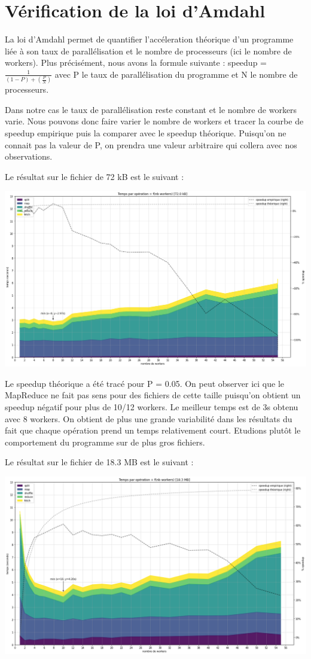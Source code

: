 \documentclass[11pt,a4paper]{article}
\begin{document}
\section{Vérification de la loi d'Amdahl}
La loi d'Amdahl permet de quantifier l'accéleration théorique d'un programme liée à son taux de parallélisation et le nombre de processeurs (ici le nombre de workers). Plus précisément, nous avons la formule suivante : speedup = $\frac{1}{(1-P)+(\frac{P}{N})}$ avec P le taux de parallélisation du programme et N le nombre de processeurs.

Dans notre cas le taux de parallélisation reste constant et le nombre de workers varie. Nous pouvons donc faire varier le nombre de workers et tracer la courbe de speedup empirique puis la comparer avec le speedup théorique. Puisqu'on ne connait pas la valeur de P, on prendra une valeur arbitraire qui collera avec nos observations.

Le résultat sur le fichier de 72 kB est le suivant :

\includegraphics[width=\columnwidth]{graph0.png}

Le speedup théorique a été tracé pour P = 0.05. On peut observer ici que le MapReduce ne fait pas sens pour des fichiers de cette taille puisqu'on obtient un speedup négatif pour plus de 10/12 workers. Le meilleur temps est de 3s obtenu avec 8 workers. On obtient de plus une grande variabilité dans les résultats du fait que chaque opération prend un temps relativement court. Etudions plutôt le comportement du programme sur de plus gros fichiers.

Le résultat sur le fichier de 18.3 MB est le suivant :

\includegraphics[width=\columnwidth]{graph1.png}
\end{document}
